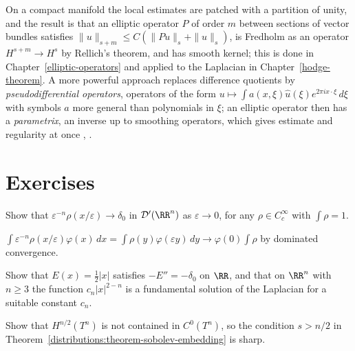 \begin{remark}\label{distributions:remark-variable-coefficients}
On a compact manifold the local estimates are patched with a partition of unity, and the result is that an elliptic operator $P$ of order $m$ between sections of vector bundles satisfies
$\|u\|_{s+m} \leq C(\|Pu\|_s + \|u\|_s)$, is Fredholm as an operator $H^{s+m} \to H^s$ by Rellich's theorem, and has smooth kernel; this is done in Chapter~\ref{elliptic-operators} and applied to the
Laplacian in Chapter~\ref{hodge-theorem}. A more powerful approach replaces difference quotients by \emph{pseudodifferential operators}, operators of the form
$u \mapsto \int a(x, \xi)\hat u(\xi)e^{2\pi ix\cdot\xi}\,d\xi$ with symbols $a$ more general than polynomials in $\xi$; an elliptic operator then has a \emph{parametrix}, an inverse up to smoothing operators, which
gives estimate and regularity at once \cite[Chapters 7--10]{hormander-pdo1}, \cite[Chapter 6]{warner-foundations}.
\end{remark}

\section{Exercises}\label{distributions:section-exercises}

\begin{exercise}\label{distributions:exercise-delta-limit}
Show that $\varepsilon^{-n}\rho(x/\varepsilon) \to \delta_0$ in $\mathcal{D}'(\RR^n)$ as $\varepsilon \to 0$, for any $\rho \in C_c^\infty$ with $\int\rho = 1$.
\end{exercise}

\begin{solution}
$\int\varepsilon^{-n}\rho(x/\varepsilon)\varphi(x)\,dx = \int\rho(y)\varphi(\varepsilon y)\,dy \to \varphi(0)\int\rho$ by dominated convergence.
\end{solution}

\begin{exercise}\label{distributions:exercise-fundamental-solution}
Show that $E(x) = \frac{1}{2}|x|$ satisfies $-E'' = -\delta_0$ on $\RR$, and that on $\RR^n$ with $n \geq 3$ the function $c_n|x|^{2-n}$ is a fundamental solution of the Laplacian for a suitable constant
$c_n$.
\end{exercise}

\begin{exercise}\label{distributions:exercise-sobolev-sharp}
Show that $H^{n/2}(T^n)$ is not contained in $C^0(T^n)$, so the condition $s > n/2$ in Theorem~\ref{distributions:theorem-sobolev-embedding} is sharp.
\end{exercise}

